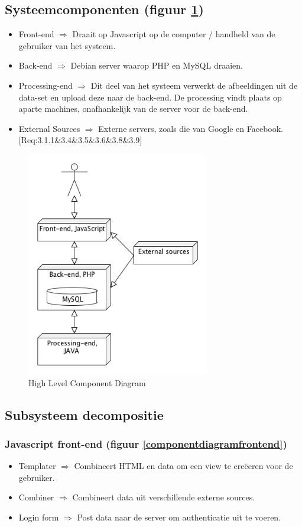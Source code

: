 \documentclass[a4paper,10pt]{article}
\begin{document}
	\subsection{Systeemcomponenten (figuur \ref{componentdiagramhighlevel})}
	\begin{itemize}
		\item Front-end $\Rightarrow$ Draait op Javascript op de computer / handheld van de gebruiker van het systeem.
		\item Back-end $\Rightarrow$ Debian server waarop PHP en MySQL draaien.
		\item Processing-end $\Rightarrow$ Dit deel van het systeem verwerkt de afbeeldingen uit de data-set en upload deze naar de back-end. De processing vindt plaats op aparte machines, onafhankelijk van de server voor de back-end.
		\item External Sources $\Rightarrow$ Externe servers, zoals die van Google en Facebook.[Req:3.1.1\&3.4\&3.5\&3.6\&3.8\&3.9]

	\end{itemize}
	\begin{figure}[ht!]
	\centering
	\includegraphics[width=8cm]{componentDiagram_highlevel.png}
	\caption{High Level Component Diagram \label{componentdiagramhighlevel}}
	\end{figure}
	
	\subsection{Subsysteem decompositie}
		\subsubsection{Javascript front-end (figuur \ref{componentdiagramfrontend})}
		\begin{itemize}
			\item Templater $\Rightarrow$ Combineert HTML en data om een view te cre\"eeren voor de gebruiker.
			\item Combiner $\Rightarrow$ Combineert data uit verschillende externe sources.
			\item Login form $\Rightarrow$ Post data naar de server om authenticatie uit te voeren.
		\end{itemize}
\end{document}

